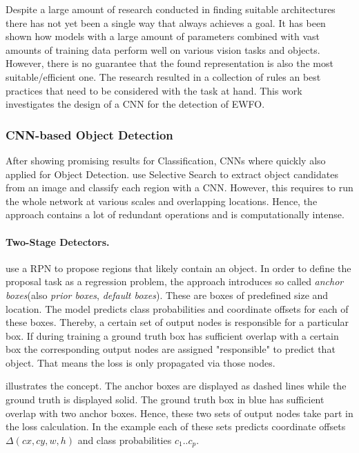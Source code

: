 Despite a large amount of research conducted in finding suitable architectures there has not yet been a single way that always achieves a goal. It has been shown how models with a large amount of parameters combined with vast amounts of training data perform well on various vision tasks and objects. However, there is no guarantee that the found representation is also the most suitable/efficient one. The research resulted in a collection of rules an best practices that need to be considered with the task at hand. This work investigates the design of a \ac{CNN} for the detection of \ac{EWFO}.

\subsubsection{\ac{CNN}-based Object Detection}

After showing promising results for Classification, \acp{CNN} where quickly also applied for Object Detection. \citeauthor{Girshick2013} \cite{Girshick2013} use Selective Search \cite{Uijlings2013} to extract object candidates from an image and classify each region with a \ac{CNN}. However, this requires to run the whole network at various scales and overlapping locations. Hence, the approach contains a lot of redundant operations and is computationally intense.

\paragraph{Two-Stage Detectors.}
\citeauthor{Ren} \cite{Ren} use a \ac{RPN} to propose regions that likely contain an object. In order to define the proposal task as a regression problem, the approach introduces so called \textit{anchor boxes}(also \textit{prior boxes}, \textit{default boxes}). These are boxes of predefined size and location. The model predicts class probabilities and coordinate offsets for each of these boxes. Thereby, a certain set of output nodes is responsible for a particular box. If during training a ground truth box has sufficient overlap with a certain box the corresponding output nodes are assigned "responsible" to predict that object. That means the loss is only propagated via those nodes. 

 illustrates the concept. The anchor boxes are displayed as dashed lines while the ground truth is displayed solid. The ground truth box in blue has sufficient overlap with two anchor boxes. Hence, these two sets of output nodes take part in the loss calculation. In the example each of these sets predicts coordinate offsets $\Delta(cx, cy, w,h)$ and class probabilities $c_1 .. c_p$.

